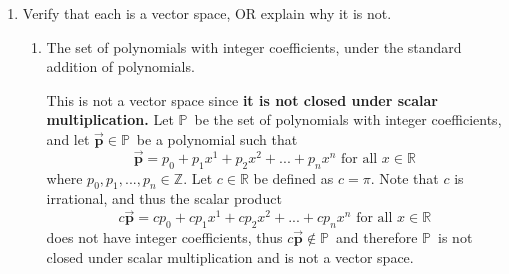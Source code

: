 \documentclass{letter}
\newcommand{\Vn}[1]{\vec{\bm{#1}}}
\newcommand{\?}{\stackrel{?}{=}}
\newcommand\Que[1]{%
   \leavevmode\noindent
   #1
}
\newcommand\Ans[2][]{%
   \leavevmode\noindent
   {
       \begin{mdframed}[backgroundcolor=blue!10]
       #2
       \end{mdframed}
   }
}
\newenvironment{Mat}[1]{%
  \left[\begin{array}{*{#1}{r}}
}{%
  \end{array}\right]
}
\begin{document}
\begin{enumerate}
\begin{enumerate}[label=(\alph*)]
{\begin{align*}
        \shortintertext{then transposing $Q$ we get}
        Q^T &=\begin{Mat}{4} p_{11} & p_{12} & \cdots & p_{1m} \\
                             p_{21} & p_{22} & \cdots & p_{2m} \\
                             \vdots & \vdots & \ddots & \vdots \\
                             p_{n1} & p_{n2} & \cdots & p_{nm} \end{Mat}
        \shortintertext{thus we find}
        Q^T&=P \qed                                   
    \end{align*}                  
    }
    \item \Que{
        If $PP^{-1}=I$, then $P^{-1}P=I$  
    } 
    \Ans{Suppose $PP^{-1}=I$.
    \begin{align*}
       PP^{-1} &= I 
       \shortintertext{multiply both sides by $P^{-1}$ and substitute I:}
       P^{-1}PP^{-1} &= P^{-1}I \\
       IP^{-1} &= P^{-1}PP^{-1}
       \shortintertext{multiply $P$\ by both sides and simplify:}
       IP^{-1}P &= P^{-1}PP^{-1}P \\
       P^{-1}P &= II \\
       P^{-1}P &= I \qed
    \end{align*}  
    }
    \end{enumerate}
    ~\\
    \item
        Verify that each is a vector space, OR explain why it is not. 
    \begin{enumerate}[label=(\alph*)]
    \item \Que{
        The set of polynomials with integer coefficients, under the standard addition of polynomials.    
    }
    \Ans{
    
    This is not a vector space since \textbf{it is not closed under scalar multiplication.}
    Let $\mathbb{P}$\ be the set of polynomials with integer coefficients, 
    and let $\Vn{p} \in \mathbb{P}$\ be a polynomial such that \[\Vn{p}=p_0+p_1x^1+p_2x^2+...+p_nx^n \text{ for all } x\in\mathbb{R}\] where $p_0,p_1,...,p_n \in \mathbb{Z}$.  Let $c \in \mathbb{R}$ be defined as $c = \pi$.  Note that $c$ is irrational, and thus the scalar product \[c\Vn{p}=cp_0+cp_1x^1+cp_2x^2+...+cp_nx^n \text{ for all } x\in\mathbb{R}\] does not have integer coefficients, thus $c\Vn{p} \not\in \mathbb{P}$\ and therefore $\mathbb{P}$\ is not closed under scalar multiplication and is not a vector space.
        
}
\end{enumerate}
\end{enumerate}
\end{document}
